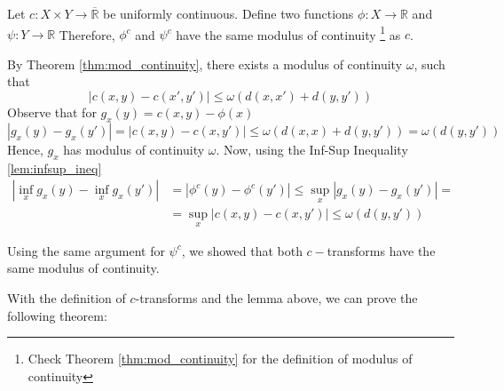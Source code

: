 \begin{lemma}
  Let $c: X \times Y \to \overline{\mathbb R}$ be uniformly continuous. Define two functions
  $\phi:X \to \mathbb R$ and $\psi : Y \to \mathbb R$
  Therefore, $\phi^c$ and $\psi^c$ have the same modulus of continuity
  \footnote{Check Theorem \ref{thm:mod_continuity} for the definition of modulus of continuity}
  as $c$.
  \label{lem:cunif}
\end{lemma}
\begin{prf}
  By Theorem \ref{thm:mod_continuity}, there exists a modulus
  of continuity $\omega$, such that
  \begin{equation*}
    |c(x,y) - c(x',y')| \leq \omega(d(x,x')+d(y,y'))
  \end{equation*}
  Observe that for $g_x(y) = c(x,y) - \phi(x)$
  \begin{equation*}
    |g_x(y) - g_x(y')|=|c(x,y) - c(x,y')| \leq
    \omega(d(x,x)+d(y,y')) = \omega(d(y,y'))
  \end{equation*}
  Hence, $g_x$ has modulus of continuity $\omega$. Now, using the
  Inf-Sup Inequality \ref{lem:infsup_ineq}
  \begin{align*}
    |\inf_x g_x(y) - \inf_x g_x(y')| & =
    |\phi^c(y) - \phi^c(y')| \leq \sup_x |g_x(y) - g_x(y')| =                          \\
                                     & =\sup_x |c(x,y) - c(x,y')| \leq \omega(d(y,y'))
  \end{align*}

  Using the same argument for $\psi^c$, we showed that both
  $c-$transforms have the same modulus of continuity.

\end{prf}

With the definition of $c$-transforms and the lemma above, we can prove the following theorem:

